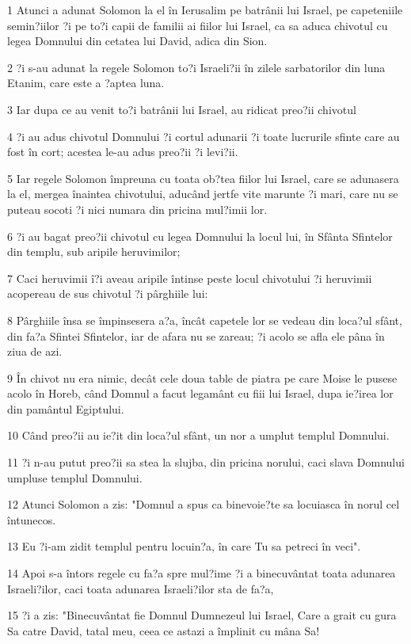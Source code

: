 \par 1 Atunci a adunat Solomon la el în Ierusalim pe batrânii lui Israel, pe capeteniile semin?iilor ?i pe to?i capii de familii ai fiilor lui Israel, ca sa aduca chivotul cu legea Domnului din cetatea lui David, adica din Sion.
\par 2 ?i s-au adunat la regele Solomon to?i Israeli?ii în zilele sarbatorilor din luna Etanim, care este a ?aptea luna.
\par 3 Iar dupa ce au venit to?i batrânii lui Israel, au ridicat preo?ii chivotul
\par 4 ?i au adus chivotul Domnului ?i cortul adunarii ?i toate lucrurile sfinte care au fost în cort; acestea le-au adus preo?ii ?i levi?ii.
\par 5 Iar regele Solomon împreuna cu toata ob?tea fiilor lui Israel, care se adunasera la el, mergea înaintea chivotului, aducând jertfe vite marunte ?i mari, care nu se puteau socoti ?i nici numara din pricina mul?imii lor.
\par 6 ?i au bagat preo?ii chivotul cu legea Domnului la locul lui, în Sfânta Sfintelor din templu, sub aripile heruvimilor;
\par 7 Caci heruvimii î?i aveau aripile întinse peste locul chivotului ?i heruvimii acopereau de sus chivotul ?i pârghiile lui:
\par 8 Pârghiile însa se împinsesera a?a, încât capetele lor se vedeau din loca?ul sfânt, din fa?a Sfintei Sfintelor, iar de afara nu se zareau; ?i acolo se afla ele pâna în ziua de azi.
\par 9 În chivot nu era nimic, decât cele doua table de piatra pe care Moise le pusese acolo în Horeb, când Domnul a facut legamânt cu fiii lui Israel, dupa ie?irea lor din pamântul Egiptului.
\par 10 Când preo?ii au ie?it din loca?ul sfânt, un nor a umplut templul Domnului.
\par 11 ?i n-au putut preo?ii sa stea la slujba, din pricina norului, caci slava Domnului umpluse templul Domnului.
\par 12 Atunci Solomon a zis: "Domnul a spus ca binevoie?te sa locuiasca în norul cel întunecos.
\par 13 Eu ?i-am zidit templul pentru locuin?a, în care Tu sa petreci în veci".
\par 14 Apoi s-a întors regele cu fa?a spre mul?ime ?i a binecuvântat toata adunarea Israeli?ilor, caci toata adunarea Israeli?ilor sta de fa?a,
\par 15 ?i a zis: "Binecuvântat fie Domnul Dumnezeul lui Israel, Care a grait cu gura Sa catre David, tatal meu, ceea ce astazi a împlinit cu mâna Sa!
